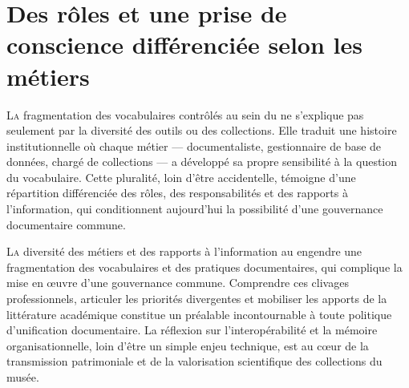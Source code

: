 \chapter[PDV métier]{\label{II-B}Des rôles et une prise de conscience différenciée selon les métiers }

\lettrine{L}a fragmentation des vocabulaires contrôlés au sein du \maelong ne s'explique pas seulement par la diversité des outils ou des collections. Elle traduit une histoire institutionnelle où chaque métier — documentaliste, gestionnaire de base de données, chargé de collections — a développé sa propre sensibilité à la question du vocabulaire. Cette pluralité, loin d'être accidentelle, témoigne d'une répartition différenciée des rôles, des responsabilités et des rapports à l'information, qui conditionnent aujourd'hui la possibilité d'une gouvernance documentaire commune.




\bigskip
\bigskip
\bigskip

\lettrine{L}{a} diversité des métiers et des rapports à l'information au \mae engendre une fragmentation des vocabulaires et des pratiques documentaires, qui complique la mise en œuvre d'une gouvernance commune. Comprendre ces clivages professionnels, articuler les priorités divergentes et mobiliser les apports de la littérature académique constitue un préalable incontournable à toute politique d'unification documentaire. La réflexion sur l'interopérabilité et la mémoire organisationnelle, loin d'être un simple enjeu technique, est au cœur de la transmission patrimoniale et de la valorisation scientifique des collections du musée. 